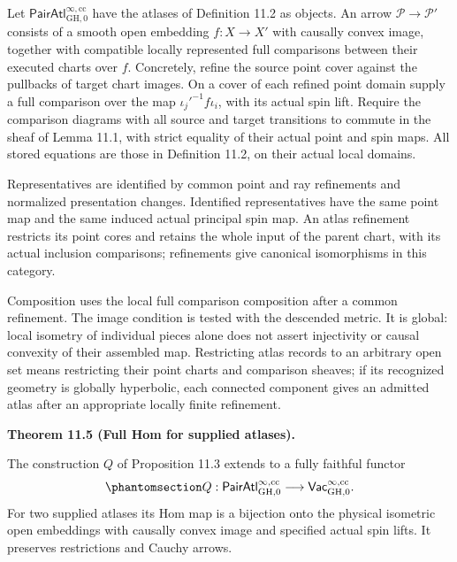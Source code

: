 \documentclass[
  english,
  11pt,
  reqno]{amsart}
\makeatletter
\newcommand{\pandocstatementheading}[1]{%
  \par\addpenalty{\@beginparpenalty}%
  \addvspace{.5\baselineskip plus .2\baselineskip minus .2\baselineskip}%
  {\normalfont\bfseries #1\par}%
  \nobreak\@afterindenttrue\@afterheading
}
\makeatother
\begin{document}
Let \(\mathsf{PairAtl}^{\infty,\mathrm{cc}}_{\mathrm{GH},0}\) have the
atlases of Definition 11.2 as objects. An arrow
\(\mathcal P\to\mathcal P'\) consists of a smooth open embedding
\(f:X\to X'\) with causally convex image, together with compatible
locally represented full comparisons between their executed charts over
\(f\). Concretely, refine the source point cover against the pullbacks
of target chart images. On a cover of each refined point domain supply a
full comparison over the map \(\iota_j'^{-1}f\iota_i\), with its actual
spin lift. Require the comparison diagrams with all source and target
transitions to commute in the sheaf of Lemma 11.1, with strict equality
of their actual point and spin maps. All stored equations are those in
Definition 11.2, on their actual local domains.

Representatives are identified by common point and ray refinements and
normalized presentation changes. Identified representatives have the
same point map and the same induced actual principal spin map. An atlas
refinement restricts its point cores and retains the whole input of the
parent chart, with its actual inclusion comparisons; refinements give
canonical isomorphisms in this category.

Composition uses the local full comparison composition after a common
refinement. The image condition is tested with the descended metric. It
is global: local isometry of individual pieces alone does not assert
injectivity or causal convexity of their assembled map. Restricting
atlas records to an arbitrary open set means restricting their point
charts and comparison sheaves; if its recognized geometry is globally
hyperbolic, each connected component gives an admitted atlas after an
appropriate locally finite refinement.

\pandocstatementheading{\protect{}\label{thm:ordinary-atlas-full-hom}Theorem 11.5 (Full Hom for supplied atlases).}

The construction \(Q\) of Proposition 11.3 extends to a fully faithful
functor
\begin{equation}\protect\phantomsection\label{eq:ordinary-atlas-geometric-functor}{
Q:\mathsf{PairAtl}^{\infty,\mathrm{cc}}_{\mathrm{GH},0}
\longrightarrow\mathsf{Vac}^{\infty,\mathrm{cc}}_{\mathrm{GH},0}.
}\end{equation} For two supplied atlases its Hom map is a bijection onto
the physical isometric open embeddings with causally convex image and
specified actual spin lifts. It preserves restrictions and Cauchy
arrows.
\end{document}
